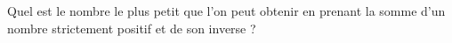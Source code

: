
\begin{exercice}\label{exoPremiere-0028}

    Quel est le nombre le plus petit que l'on peut obtenir en prenant la somme d'un nombre strictement positif et de son inverse ?

\end{exercice}

